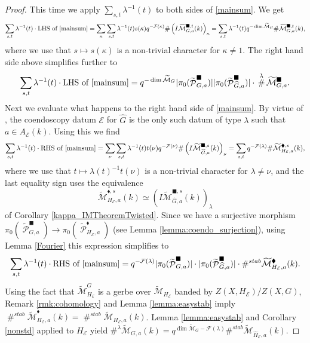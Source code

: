 \documentclass{article}
\DeclareMathOperator{\hash}{\#}
\DeclareMathOperator{\A}{\mathsf{A}}
\newcommand{\Ec}{\mathcal{E}}
\newcommand{\Mc}{\mathcal{M}}
\DeclareMathOperator{\Pc}{\mathcal{P}}
\newcommand{\CE}{{\mathcal E}}
\newcommand{\CF}{{\mathcal F}}
\newcommand{\wmc}{\widetilde{\Mc} }
\newcommand{\wac}{\widetilde{\A} }
\theoremstyle{definition}
\theoremstyle{plain}
\begin{document}
\begin{proof} 
This time we apply $\sum_{s,t} \lambda^{-1}(t)$ to both sides of \eqref{mainsum}. We get 
$$\sum_{s,t} \lambda^{-1}(t) \cdot{} \text{LHS of \eqref{mainsum}} =  \sum_{\kappa} \sum_{s,t}   \lambda^{-1}(t) s( \kappa) q^{-\CF(\kappa)} \# \left(I\wmc_{G,a}^{\blacksquare,t}(k)\right)_{\kappa} = \sum_{s,t} \lambda^{-1}(t) q^{-\dim \wmc_G} \# \wmc_{G,a}^{\blacksquare,t}(k),$$
where we use that $s \mapsto s(\kappa)$ is a non-trivial character for $\kappa \neq 1$. The right hand side above simplifies further to
$$\sum_{s,t} \lambda^{-1}(t) \cdot{} \text{LHS of \eqref{mainsum}} = q^{-\dim \wmc_G}|\pi_0(\widetilde{\Pc}_{G,a}^{\blacksquare})||\pi_0(\widetilde{\Pc}^{\blacksquare}_{\widehat{G},a})| \cdot{} \hash^{\lambda} \widetilde{\Mc}_{G,a}^{\blacksquare}.$$
Next we evaluate what happens to the right hand side of \eqref{mainsum}. By virtue of \cite[Proposition 6.3.3]{MR2653248}, the coendoscopy datum $\CE$ for $\widehat G$ is the only such datum of type $\lambda$ such that $a \in A_\CE(k)$. Using this we find
$$\sum_{s,t} \lambda^{-1}(t) \cdot{} \text{RHS of \eqref{mainsum}} = \sum_{\nu}  \sum_{s,t} \lambda^{-1}(t) t( \nu) q^{-\CF(\nu)} \# \left(I\wmc_{\widehat{G},a}^{\blacksquare,s}(k)\right)_{\nu} = \sum_{s,t}q^{-\CF(\lambda)} \# \wmc_{{H}_\CE,a}^{\blacklozenge,s}(k),$$
where we use that $t \mapsto \lambda(t)^{-1} t(\nu)$ is a non-trivial character for $\lambda \neq \nu$, and the last equality sign uses the equivalence
$$\wmc_{{H}_\CE,a}^{\blacklozenge,s}(k) \simeq \left(I\wmc_{\widehat{G},a}^{\blacksquare,s}(k)\right)_{\lambda}$$
of Corollary \ref{kappa_IMTheoremTwisted}.
Since we have a surjective morphism $\pi_0(\widetilde{\Pc}_{G,a}^{\blacksquare}) \to \pi_0(\widetilde{\Pc}_{H_{\Ec},a}^{\blacklozenge})$ (see Lemma \ref{lemma:coendo_surjection}), using Lemma \ref{Fourier} this expression simplifies to
$$\sum_{s,t} \lambda^{-1}(t) \cdot{} \text{RHS of \eqref{mainsum}} =  q^{-\CF(\lambda)}|\pi_0(\widetilde{\Pc}_{G,a}^{\blacksquare})|\cdot{}|\pi_0(\widetilde{\Pc}_{\widehat{G},a}^{\blacksquare})|\cdot{} \#^{stab} \wmc_{{H}_\CE,a}^{\blacklozenge}(k).$$
Using the fact that $\wmc_{H_{\Ec}}^{G}$ is a gerbe over $\wmc_{H_{\Ec}}$ banded by $Z(X,H_{\Ec})/Z(X,G)$, Remark \ref{rmk:cohomology} and Lemma \ref{lemma:easystab} imply $ \hash^{stab} \widetilde{\Mc}_{H_{\Ec},a}^{\blacklozenge}(k)=\hash^{stab} \widetilde{\Mc}_{H_{\Ec},a}(k)$. Lemma \ref{lemma:easystab} and Corollary \ref{nonstd} applied to $H_{\CE}$ yield $\#^{\lambda} \wmc_{G,a}(k) =q^{\dim \wmc_G-\CF(\lambda)}\#^{stab} \wmc_{\widehat{H}_\CE,a}(k)$.
\end{proof}
\end{document}
